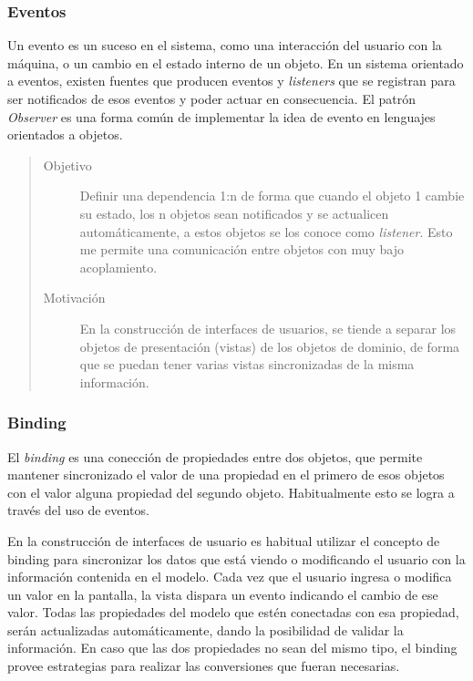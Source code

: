 \subsubsection{Eventos}
\label{Eventos}

		Un evento es un suceso en el sistema, como una interacción del usuario con
	la máquina, o un cambio en el estado interno de un objeto.
	En un sistema orientado a eventos, existen fuentes que producen eventos y
	\emph{listeners} que se registran para ser notificados de esos eventos y poder
	actuar en consecuencia.	
	El patrón \emph{Observer} \cite{Gamma1995} es una forma común de implementar la
	idea de evento en lenguajes orientados a objetos.
	
	\begin{quote}
	
	\begin{description}
	   
	\item [Objetivo] Definir una dependencia 1:n de forma que cuando el objeto
		1 cambie su estado, los n objetos sean notificados y se actualicen
		automáticamente, a estos objetos se los conoce como \emph{listener}. Esto me
		permite una comunicación entre objetos con muy bajo acoplamiento.
	
	\item [Motivación] En la construcción de interfaces de usuarios, se tiende
		a separar los objetos de presentación (vistas) de los objetos de dominio, de
		forma que se puedan tener varias vistas sincronizadas de la misma información.
	
	\end{description}
	\end{quote}
	
\subsubsection{Binding}
\label{binding}

	El \emph{binding} es una conección de propiedades entre dos objetos, que
	permite mantener sincronizado el valor de una propiedad en el primero de esos
	objetos con el valor alguna propiedad del segundo objeto.
	Habitualmente esto se logra a través del uso de eventos.
	
	En la construcción de interfaces de usuario es habitual utilizar el concepto de
	binding para sincronizar los datos que está viendo o modificando el usuario
	con la información contenida en el modelo.
	Cada vez que el usuario ingresa o modifica un valor en la pantalla, la
	vista dispara un evento indicando el cambio de ese valor. Todas las
	propiedades del modelo que estén conectadas con esa propiedad, serán
	actualizadas automáticamente, dando la posibilidad de validar la información.
	En caso que las dos propiedades no sean del mismo tipo, el binding provee
	estrategias para realizar las conversiones que fueran necesarias.

